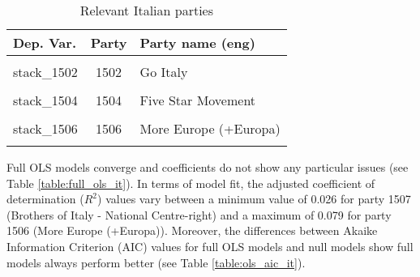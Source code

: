 \documentclass[
]{article}
\begin{document}
\begin{table}[!h]

\caption{\label{tab:unnamed-chunk-96}Relevant Italian parties \label{table:relprty_tab_it}}
\centering
\begin{tabular}[t]{lcl}
\toprule
Dep. Var. & Party & Party name (eng)\\
\midrule
\cellcolor{gray!6}{stack\_1501} & \cellcolor{gray!6}{1501} & \cellcolor{gray!6}{Democratic Party}\\
stack\_1502 & 1502 & Go Italy\\
\cellcolor{gray!6}{stack\_1503} & \cellcolor{gray!6}{1503} & \cellcolor{gray!6}{Northern League}\\
stack\_1504 & 1504 & Five Star Movement\\
\cellcolor{gray!6}{stack\_1505} & \cellcolor{gray!6}{1505} & \cellcolor{gray!6}{Italian Left}\\
\addlinespace
stack\_1506 & 1506 & More Europe (+Europa)\\
\cellcolor{gray!6}{stack\_1507} & \cellcolor{gray!6}{1507} & \cellcolor{gray!6}{Brothers of Italy - National Centre-right}\\
\bottomrule
\end{tabular}
\end{table}

Full OLS models converge and coefficients do not show any particular issues (see Table
\ref{table:full_ols_it}).
In terms of model fit, the adjusted coefficient of determination (\(R^2\)) values vary between
a minimum value of 0.026
for party 1507
(Brothers of Italy - National Centre-right)
and a maximum of 0.079
for party 1506
(More Europe (+Europa)).
Moreover, the differences between Akaike Information Criterion (AIC) values for full OLS models and null
models show full models always perform better (see Table
\ref{table:ols_aic_it}).
\end{document}
